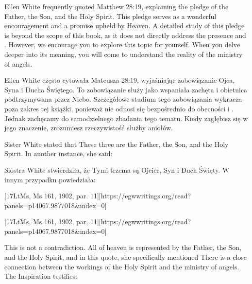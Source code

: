 Ellen White frequently quoted Matthew 28:19, explaining the pledge of the Father, the Son, and the Holy Spirit. This pledge serves as a wonderful encouragement and a promise upheld by Heaven. A detailed study of this pledge is beyond the scope of this book, as it does not directly address the presence and . However, we encourage you to explore this topic for yourself. When you delve deeper into its meaning, you will come to understand the reality of the ministry of angels.


Ellen White często cytowała Mateusza 28:19, wyjaśniając zobowiązanie Ojca, Syna i Ducha Świętego. To zobowiązanie służy jako wspaniała zachęta i obietnica podtrzymywana przez Niebo. Szczegółowe studium tego zobowiązania wykracza poza zakres tej książki, ponieważ nie odnosi się bezpośrednio do obecności i . Jednak zachęcamy do samodzielnego zbadania tego tematu. Kiedy zagłębisz się w jego znaczenie, zrozumiesz rzeczywistość służby aniołów.


Sister White stated that  These three are the Father, the Son, and the Holy Spirit. In another instance, she said:


Siostra White stwierdziła, że  Tymi trzema są Ojciec, Syn i Duch Święty. W innym przypadku powiedziała:


[17LtMs, Ms 161, 1902, par. 11][https://egwwritings.org/read?panels=p14067.9877018&index=0]


[17LtMs, Ms 161, 1902, par. 11][https://egwwritings.org/read?panels=p14067.9877018&index=0]


This is not a contradiction. All of heaven is represented by the Father, the Son, and the Holy Spirit, and in this quote, she specifically mentioned  There is a close connection between the workings of the Holy Spirit and the ministry of angels. The Inspiration testifies:


